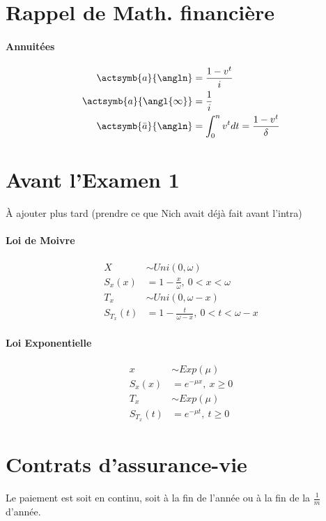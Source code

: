 \documentclass[10pt, french]{article}
\begin{document}
\footnotesize %
\begin{multicols*}{3} %
\section*{Rappel de Math. financière}
\paragraph{Annuitées}
\begin{align*}
	\actsymb{a}{\angln} &= \frac{1 - v^t}{i} \\
	\actsymb{a}{\angl{\infty}} &= \frac{1}{i} \\
	\actsymb{\bar{a}}{\angln} &= \int_0^n v^t dt = \frac{1 - v^t}{\delta}
\end{align*}

\section{Avant l'Examen 1}
À ajouter plus tard (prendre ce que Nich avait déjà fait avant l'intra)

\paragraph{Loi de Moivre}
\begin{align*}
	X &\sim Uni(0, \omega) \\
	S_x(x) &= 1 - \frac{x}{\omega},\: 0 < x < \omega \\
	T_x &\sim Uni(0, \omega - x) \\
	S_{T_x}(t) &= 1 - \frac{t}{\omega - x},\: 0 < t < \omega - x
\end{align*}

\paragraph{Loi Exponentielle}
\begin{align*}
	x &\sim Exp(\mu) \\
	S_x(x) &= e^{-\mu x},\: x \geq 0 \\
	T_x &\sim Exp(\mu) \\
	S_{T_x}(t) &= e^{-\mu t},\: t \geq 0
\end{align*}

\section{Contrats d'assurance-vie}
Le paiement est soit en continu, soit à la fin de l'année ou à la fin de la $\frac{1}{m}$ d'année.


\end{multicols*}
\end{document}
